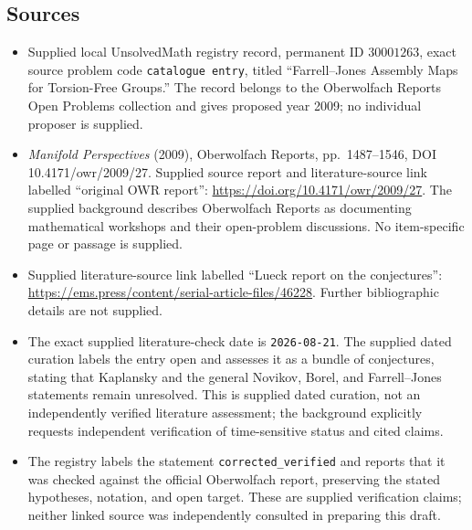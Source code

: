 \documentclass[11pt]{article}
\begin{document}
\subsection{Sources}
\begin{itemize}
\item Supplied local UnsolvedMath registry record, permanent ID \(30001263\), exact source problem code \texttt{catalogue entry}, titled ``Farrell--Jones Assembly Maps for Torsion-Free Groups.'' The record belongs to the Oberwolfach Reports Open Problems collection and gives proposed year 2009; no individual proposer is supplied.
\item \emph{Manifold Perspectives} (2009), Oberwolfach Reports, pp.~1487--1546, DOI 10.4171/owr/2009/27. Supplied source report and literature-source link labelled ``original OWR report'': \url{https://doi.org/10.4171/owr/2009/27}. The supplied background describes Oberwolfach Reports as documenting mathematical workshops and their open-problem discussions. No item-specific page or passage is supplied.
\item Supplied literature-source link labelled ``Lueck report on the conjectures'': \url{https://ems.press/content/serial-article-files/46228}. Further bibliographic details are not supplied.
\item The exact supplied literature-check date is \texttt{2026-08-21}. The supplied dated curation labels the entry open and assesses it as a bundle of conjectures, stating that Kaplansky and the general Novikov, Borel, and Farrell--Jones statements remain unresolved. This is supplied dated curation, not an independently verified literature assessment; the background explicitly requests independent verification of time-sensitive status and cited claims.
\item The registry labels the statement \texttt{corrected\_verified} and reports that it was checked against the official Oberwolfach report, preserving the stated hypotheses, notation, and open target. These are supplied verification claims; neither linked source was independently consulted in preparing this draft.
\end{itemize}
\end{document}
